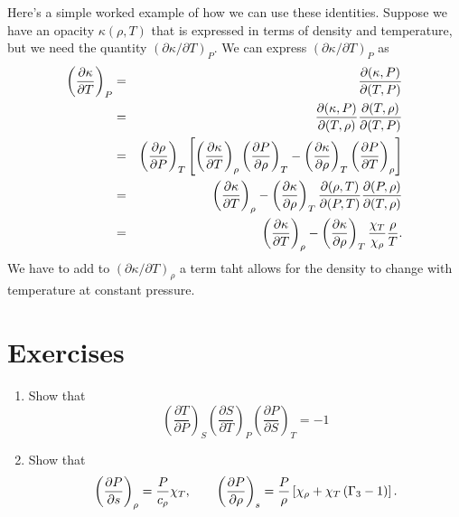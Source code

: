 Here's a simple worked example of how we can use these identities.  Suppose we have an opacity $\kappa(\rho,T)$ that is expressed in terms of density and temperature, but we need the quantity $(\partial \kappa/\partial T)_{P}$. We can express $(\partial\kappa/\partial T)_{P}$ as
\begin{eqnarray}
\left(\frac{\partial \kappa}{\partial T}\right)_{P} &=& \frac{\partial(\kappa,P)}{\partial(T,P)}\nonumber\\
 &=& \frac{\partial(\kappa,P)}{\partial(T,\rho)}\frac{\partial(T,\rho)}{\partial(T,P)}\nonumber\\
 &=& \left(\frac{\partial \rho}{\partial P}\right)_{T}\left[\left(\frac{\partial \kappa}{\partial T}\right)_{\rho}\left(\frac{\partial P}{\partial \rho}\right)_{T}-\left(\frac{\partial \kappa}{\partial \rho}\right)_{T}\left(\frac{\partial P}{\partial T}\right)_{\rho}\right]
 \nonumber\\
 &=& \left(\frac{\partial \kappa}{\partial T}\right)_{\rho} - \left(\frac{\partial \kappa}{\partial \rho}\right)_{T}\frac{\partial(\rho,T)}{\partial(P,T)}\frac{\partial(P,\rho)}{\partial(T,\rho)}\nonumber\\
 &=& \left(\frac{\partial \kappa}{\partial T}\right)_{\rho} - \left(\frac{\partial \kappa}{\partial \rho}\right)_{T} \frac{\chi_{T}}{\chi_{\rho}}\frac{\rho}{T}.
\end{eqnarray}
We have to add to $(\partial \kappa/\partial T)_{\rho}$ a term taht allows for the density to change with temperature at constant pressure.

\section{Exercises}\label{s.thermo-exercises}
\begin{enumerate}
\item Show that 
\[
 	\left(\frac{\partial T}{\partial P}\right)_{S} 
 	\left(\frac{\partial S}{\partial T}\right)_{P} 
 	\left(\frac{\partial P}{\partial S}\right)_{T} = -1
\]

\item \label{ex.gamma-trans} Show that
\[ 
\left(\frac{\partial P}{\partial s}\right)_{\rho} = \frac{P}{c_{\rho}}\chi_{T},\qquad \left(\frac{\partial P}{\partial \rho}\right)_{s} = \frac{P}{\rho}\left[\chi_{\rho} + \chi_{T}\left(\Gamma_{3}-1\right)\right].
\]
\end{enumerate}
